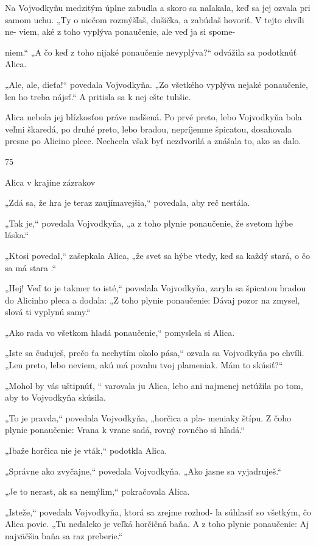 \documentclass[12pt]{book}
\begin{document}
\begin{Parallel}[p]{}{}
{Na Vojvodkyňu medzitým úplne zabudla a skoro sa
naľakala, keď sa jej ozvala pri samom uchu. „Ty o niečom
rozmýšľaš, dušička, a zabúdaš hovoriť. V tejto chvíli ne-
viem, aké z toho vyplýva ponaučenie, ale veď ja si spome-

niem.“
„A čo keď z toho nijaké ponaučenie nevyplýva?“ odvážila
sa podotknúť Alica.

„Ale, ale, dieťa!“ povedala Vojvodkyňa. „Zo všetkého
vyplýva nejaké ponaučenie, len ho treba nájsť.“ A pritisla sa
k nej ešte tuhšie.

Alica nebola jej blízkosťou práve nadšená. Po prvé preto,
lebo Vojvodkyňa bola veľmi škaredá, po druhé preto, lebo
bradou, nepríjemne špicatou, dosahovala presne po Alicino
plece. Nechcela však byť nezdvorilá a znášala to, ako sa
dalo.

75

Alica v krajine zázrakov

„Zdá sa, že hra je teraz zaujímavejšia,“ povedala, aby reč
nestála.

„Tak je,“ povedala Vojvodkyňa, „a z toho plynie
ponaučenie, že svetom hýbe láska.“

„Ktosi povedal,“ zašepkala Alica, „že svet sa hýbe vtedy,
keď sa každý stará, o čo sa má stara .“

„Hej! Veď to je takmer to isté,“ povedala Vojvodkyňa,
zaryla sa špicatou bradou do Alicinho pleca a dodala:
„Z toho plynie ponaučenie: Dávaj pozor na zmysel, slová
ti vyplynú samy.“

„Ako rada vo všetkom hladá ponaučenie,“ pomyslela si
Alica.

„Iste sa čuduješ, prečo ťa nechytím okolo pása,“ ozvala sa
Vojvodkyňa po chvíli. „Len preto, lebo neviem, akú má
povahu tvoj plameniak. Mám to skúsiť?“

„Mohol by vás uštipnúť, “ varovala ju Alica, lebo ani
najmenej netúžila po tom, aby to Vojvodkyňa skúsila.

„To je pravda,“ povedala Vojvodkyňa, „horčica a pla-
meniaky štípu. Z čoho plynie ponaučenie: Vrana k vrane
sadá, rovný rovného si hľadá.“

„Ibaže horčica nie je vták,“ podotkla Alica.

„Správne ako zvyčajne,“ povedala Vojvodkyňa. „Ako
jasne sa vyjadruješ.“

„Je to nerast, ak sa nemýlim,“ pokračovala Alica.

„Isteže,“ povedala Vojvodkyňa, ktorá sa zrejme rozhod-
la súhlasiť so všetkým, čo Alica povie. „Tu neďaleko je veľká
horčičná baňa. A z toho plynie ponaučenie: Aj najväčšia
baňa sa raz preberie.“

}
\end{Parallel}
\end{document}
